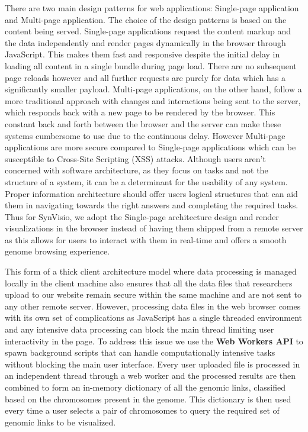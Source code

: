 There are two main design patterns for web applications: Single-page application and Multi-page application. The choice of the design patterns is based on the content being served. Single-page applications request the content markup and the data independently and render pages dynamically in the browser through JavaScript. This makes them fast and responsive despite the initial delay in loading all content in a single bundle during page load. There are no subsequent page reloads however and all further requests are purely for data which has a significantly smaller payload. Multi-page applications, on the other hand, follow a more traditional approach with changes and interactions being sent to the server, which responds back with a new page to be rendered by the browser. This constant back and forth between the browser and the server can make these systems cumbersome to use due to the continuous delay. However Multi-page applications are more secure compared to Single-page applications which can be susceptible to Cross-Site Scripting (XSS) attacks.
Although users aren't concerned with software architecture, as they focus on tasks and not the structure of a system, it can be a determinant for the usability of any system. Proper information architecture should offer users logical structures that can aid them in navigating towards the right answers and completing the required tasks\cite{rosenfeld2002information}. Thus for SynVisio, we adopt the Single-page architecture design and render visualizations in the browser instead of having them shipped from a remote server as this allows for users to interact with them in real-time and offers a smooth genome browsing experience\cite{nielsen2010visualizing}. 

This form of a thick client architecture model where data processing is managed locally in the client machine also ensures that all the data files that researchers upload to our website remain secure within the same machine and are not sent to any other remote server. However, processing data files in the web browser comes with its own set of complications as JavaScript has a single threaded environment and any intensive data processing can block the main thread limiting user interactivity in the page. To address this issue we use the \textbf{Web Workers API} to spawn background scripts that can handle computationally intensive tasks without blocking the main user interface\cite{webworkers}. Every user uploaded file is processed in an independent thread through a web worker and the processed results are then combined to form an in-memory dictionary of all the genomic links, classified based on the chromosomes present in the genome. This dictionary is then used every time a user selects a pair of chromosomes to query the required set of genomic links to be visualized.

